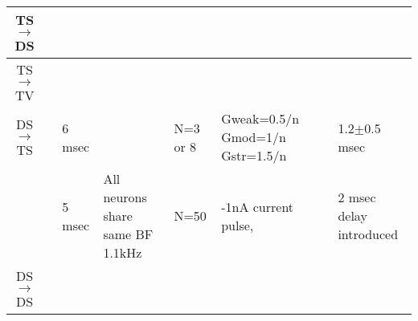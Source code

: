 \begin{longtable}{cXXXXXXX}
  TS\ensuremath{\rightarrow}DS   &                                                                                                                                          &                                                                                                                 &                                                           &                                           &                                                                                             &                                           & \\\hline 
  TS\ensuremath{\rightarrow}TV   &                                                                                                                                          &                                                                                                                 &                                                           &                                           &                                                                                             &                                           & \\\hline 
  DS\ensuremath{\rightarrow}TS   &                                                       \citep{ErikssonRobert:1999}                                                        &                                                     6 msec                                                      &                                                           &                 N=3 or 8                  &                               Gweak=0.5/n Gmod=1/n Gstr=1.5/n                               &                                           & 1.2$\pm$0.5 msec \\\hline 
                                 &                                                        \citep{PressnitzerMeddisEtAl:2001}                                                         &                                                     5 msec                                                      &             All neurons share same BF 1.1kHz              &                    N=50                   &                                    {}-1nA current pulse,                                    &                                           & 2 msec delay introduced\\\hline 
  DS\ensuremath{\rightarrow}DS   &                                                                                                                                          &                                                                                                                 &                                                           &                                           &                                                                                             & \\\hline 

\end{longtable}
